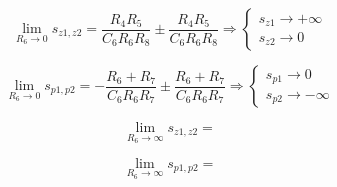 \begin{equation}
	\lim_{R_6\to 0} s_{z1,z2}=  \frac{R_4 R_5}{C_6 R_6 R_8} \pm \frac{R_4 R_5}{C_6 R_6 R_8} \Rightarrow 
	\begin{cases} 
	s_{z1} \to +\infty\\
	s_{z2} \to 0
	\end{cases}
\end{equation}

\begin{equation}
	\lim_{R_6\to 0} s_{p1,p2}=  -\frac{R_6 + R_7}{C_6 R_6 R_7} \pm \frac{R_6 + R_7}{C_6 R_6 R_7} \Rightarrow
	\begin{cases} 
	s_{p1} \to 0\\
	s_{p2} \to -\infty
	\end{cases}
\end{equation}

\begin{equation}
\lim_{R_6\to\infty}s_{z1,z2} =  
\end{equation}

\begin{equation}
\lim_{R_6\to\infty}s_{p1,p2} =  
\end{equation}

